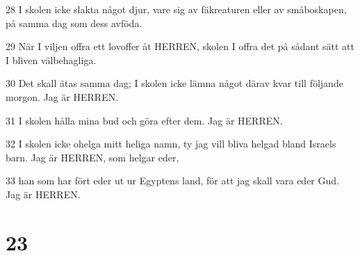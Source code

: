 \par 28 I skolen icke slakta något djur, vare sig av fäkreaturen eller av småboskapen, på samma dag som dess avföda.
\par 29 När I viljen offra ett lovoffer åt HERREN, skolen I offra det på sådant sätt att I bliven välbehagliga.
\par 30 Det skall ätas samma dag; I skolen icke lämna något därav kvar till följande morgon. Jag är HERREN.
\par 31 I skolen hålla mina bud och göra efter dem. Jag är HERREN.
\par 32 I skolen icke ohelga mitt heliga namn, ty jag vill bliva helgad bland Israels barn. Jag är HERREN, som helgar eder,
\par 33 han som har fört eder ut ur Egyptens land, för att jag skall vara eder Gud. Jag är HERREN.

\chapter{23}

